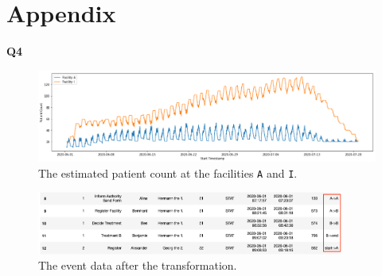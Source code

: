 \documentclass[12pt]{report}
\begin{document}
\newpage
\section{Appendix}

\textbf{Q4}

\begin{figure}[h]
    \centering
    \includegraphics[width=\textwidth]{figures/q4_fac_count.png}
    \caption{The estimated patient count at the facilities \texttt{A} and \texttt{I}.}
    \label{fig:figures-q4-fac-count-png}
\end{figure}

\begin{figure}[h]
    \centering
    \includegraphics[width=0.9\textwidth]{figures/q4_fac_move.png}
    \caption{The event data after the transformation.}
    \label{fig:figures-q4-fac-move-png}
\end{figure}
\end{document}
